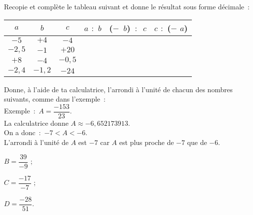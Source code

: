 \begin{exercice}
Recopie et complète le tableau suivant et donne le résultat sous forme décimale :
\begin{center}
\begin{tabular}{|c|c|c|c|c|c|}
\hline
\cellcolor{H2} $a$ & \cellcolor{H2} $b$ & \cellcolor{H2} $c$ & \cellcolor{A2} $a$ $:$ $b$ & \cellcolor{A2} ($-$ $b$) $:$ $c$ & \cellcolor{A2} $c$ $:$ ($-$ $a$) \\\hline 
\cellcolor{H3} $- 5$ & \cellcolor{H3} $+ 4$ & \cellcolor{H3} $- 4$ & \cellcolor{A3} & \cellcolor{A3} & \cellcolor{A3} \\\hline
\cellcolor{H3} $- 2,5$ & \cellcolor{H3} $- 1$ & \cellcolor{H3} $+ 20$ & \cellcolor{A3} & \cellcolor{A3} & \cellcolor{A3} \\\hline
\cellcolor{H3} $+ 8$ & \cellcolor{H3} $- 4$ & \cellcolor{H3} $- 0,5$ & \cellcolor{A3} & \cellcolor{A3} & \cellcolor{A3} \\\hline
\cellcolor{H3} $- 2,4$ & \cellcolor{H3} $- 1,2$ & \cellcolor{H3} $- 24$ & \cellcolor{A3} & \cellcolor{A3} & \cellcolor{A3} \\\hline
 \end{tabular}
 \end{center}
\end{exercice}


\begin{exercice}
Donne, à l'aide de ta calculatrice, l'arrondi à l'unité de chacun des nombres suivants, comme dans l'exemple : \\[0.5em]
Exemple : $A = \dfrac{- 153}{23}$. \\[0.5em]
La calculatrice donne $A \approx - 6,652173913$. \\[0.5em]
On a donc : $- 7 < A < - 6$. \\[0.5em]
L'arrondi à l'unité de $A$ est $- 7$ car $A$ est plus proche de $- 7$ que de $- 6$.
\begin{colitemize}{3}
 \item $B = \dfrac{39}{- 9}$ ;
 \item $C = \dfrac{- 17}{- 7}$ ;
 \item $D = \dfrac{- 28}{51}$.
 \end{colitemize}
\end{exercice}



